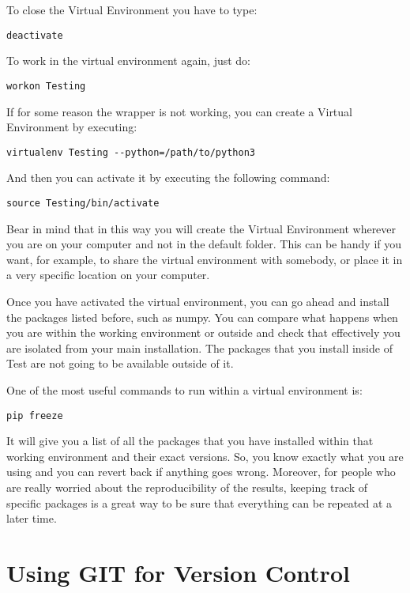 To close the Virtual Environment you have to type:

\begin{verbatim}
deactivate
\end{verbatim}

To work in the virtual environment again, just do:
\begin{verbatim}
workon Testing
\end{verbatim}

If for some reason the wrapper is not working, you can create a Virtual Environment by executing:
\begin{verbatim}
virtualenv Testing --python=/path/to/python3
\end{verbatim}
And then you can activate it by executing the following command:
\begin{verbatim}
source Testing/bin/activate 
\end{verbatim}

Bear in mind that in this way you will create the Virtual Environment wherever you are on your computer and not in the default folder. This can be handy if you want, for example, to share the virtual environment with somebody, or place it in a very specific location on your computer.

Once you have activated the virtual environment, you can go ahead and install the packages listed before, such as numpy. You can compare what happens when you are within the working environment or outside and check that effectively you are isolated from your main installation. The packages that you install inside of Test are not going to be available outside of it.

One of the most useful commands to run within a virtual environment is:

\begin{verbatim}
pip freeze
\end{verbatim}

It will give you a list of all the packages that you have installed within that working environment and their exact versions. So, you know exactly what you are using and you can revert back if anything goes wrong. Moreover, for people who are really worried about the reproducibility of the results, keeping track of specific packages is a great way to be sure that everything can be repeated at a later time.

\section{Using GIT for Version Control}

